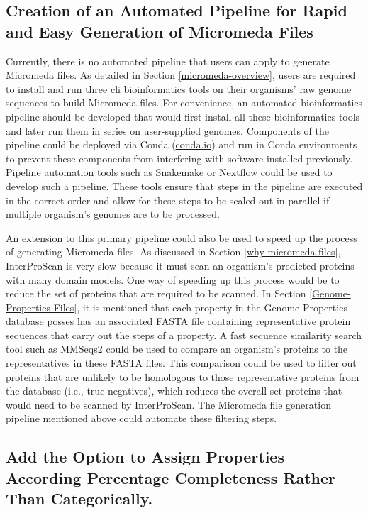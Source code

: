 \subsection{Creation of an Automated Pipeline for Rapid and Easy Generation of Micromeda Files} \label{pipeline-development}

Currently, there is no automated pipeline that users can apply to generate Micromeda files. As detailed in Section \ref{micromeda-overview}, users are required to install and run three \gls{cli} bioinformatics tools on their organisms' raw genome sequences to build Micromeda files. For convenience, an automated bioinformatics pipeline should be developed that would first install all these bioinformatics tools and later run them in series on user-supplied genomes. Components of the pipeline could be deployed via Conda (\href{http://conda.io}{conda.io}) and run in Conda environments to prevent these components from interfering with software installed previously. Pipeline automation tools such as Snakemake \cite{koster2012snakemake} or Nextflow \cite{di2017nextflow} could be used to develop such a pipeline. These tools ensure that steps in the pipeline are executed in the correct order and allow for these steps to be scaled out in parallel if multiple organism's genomes are to be processed.

An extension to this primary pipeline could also be used to speed up the process of generating Micromeda files. As discussed in Section \ref{why-micromeda-files}, InterProScan is very slow because it must scan an organism's predicted proteins with many domain models. One way of speeding up this process would be to reduce the set of proteins that are required to be scanned. In Section \ref{Genome-Properties-Files}, it is mentioned that each property in the Genome Properties database posses has an associated FASTA file containing representative protein sequences that carry out the steps of a property. A fast sequence similarity search tool such as MMSeqs2 \cite{steinegger2017mmseqs2} could be used to compare an organism's proteins to the representatives in these FASTA files. This comparison could be used to filter out proteins that are unlikely to be homologous to those representative proteins from the database (i.e., true negatives), which reduces the overall set proteins that would need to be scanned by InterProScan. The Micromeda file generation pipeline mentioned above could automate these filtering steps.

\subsection{Add the Option to Assign Properties According Percentage Completeness Rather Than Categorically.}

